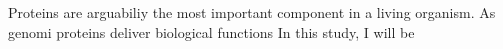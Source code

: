 Proteins are arguabiliy the most important component in a living organism. As genomi proteins deliver biological functions   In this study, I will be 